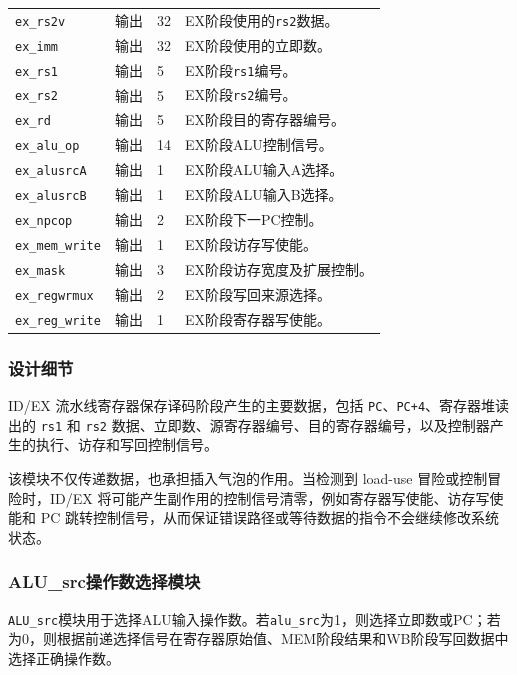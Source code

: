 \documentclass[12pt,a4paper]{ctexart}
\newcommand{\code}[1]{\texttt{#1}}
\begin{document}
{\begin{longtable}{p{3.2cm}p{1.5cm}p{2.1cm}p{7.0cm}}
\code{ex\_rs2v} & 输出 & 32 & EX阶段使用的\code{rs2}数据。 \\
\code{ex\_imm} & 输出 & 32 & EX阶段使用的立即数。 \\
\code{ex\_rs1} & 输出 & 5 & EX阶段\code{rs1}编号。 \\
\code{ex\_rs2} & 输出 & 5 & EX阶段\code{rs2}编号。 \\
\code{ex\_rd} & 输出 & 5 & EX阶段目的寄存器编号。 \\
\code{ex\_alu\_op} & 输出 & 14 & EX阶段ALU控制信号。 \\
\code{ex\_alusrcA} & 输出 & 1 & EX阶段ALU输入A选择。 \\
\code{ex\_alusrcB} & 输出 & 1 & EX阶段ALU输入B选择。 \\
\code{ex\_npcop} & 输出 & 2 & EX阶段下一PC控制。 \\
\code{ex\_mem\_write} & 输出 & 1 & EX阶段访存写使能。 \\
\code{ex\_mask} & 输出 & 3 & EX阶段访存宽度及扩展控制。 \\
\code{ex\_regwrmux} & 输出 & 2 & EX阶段写回来源选择。 \\
\code{ex\_reg\_write} & 输出 & 1 & EX阶段寄存器写使能。 \\
\bottomrule
\end{longtable}
}

\subsubsection*{设计细节}

ID/EX 流水线寄存器保存译码阶段产生的主要数据，包括 \code{PC}、\code{PC+4}、寄存器堆读出的 \code{rs1} 和 \code{rs2} 数据、立即数、源寄存器编号、目的寄存器编号，以及控制器产生的执行、访存和写回控制信号。

该模块不仅传递数据，也承担插入气泡的作用。当检测到 load-use 冒险或控制冒险时，ID/EX 将可能产生副作用的控制信号清零，例如寄存器写使能、访存写使能和 PC 跳转控制信号，从而保证错误路径或等待数据的指令不会继续修改系统状态。

\subsubsection{ALU\_src操作数选择模块}

\code{ALU\_src}模块用于选择ALU输入操作数。若\code{alu\_src}为1，则选择立即数或PC；若为0，则根据前递选择信号在寄存器原始值、MEM阶段结果和WB阶段写回数据中选择正确操作数。
\end{document}
